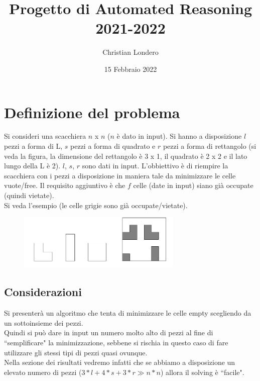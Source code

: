 \documentclass{article}
\title{Progetto di Automated Reasoning\\2021-2022}
\author{ Christian Londero }
\date{15 Febbraio 2022}
\begin{document}
\maketitle

\section{Definizione del problema}
Si consideri una scacchiera $n$ x $n$ ($n$ è dato in input). Si hanno a disposizione $l$ pezzi a forma di L, $s$ pezzi a forma di quadrato e $r$ pezzi a forma di rettangolo (si veda la figura, la dimensione del rettangolo è 3 x 1, il quadrato è 2 x 2 e il lato lungo della L è 2). $l$, $s$, $r$ sono dati in input. L'obbiettivo è di riempire la scacchiera con i pezzi a disposizione in maniera tale da minimizzare le celle vuote/free. Il requisito aggiuntivo è che $f$ celle (date in input) siano già occupate (quindi vietate).\\
Si veda l'esempio (le celle grigie sono già occupate/vietate).

\begin{figure}[ht!]
    \centering
    \includegraphics[width=0.7\textwidth]{images/def1.png}
\end{figure}

\subsection{Considerazioni}
Si presenterà un algoritmo che tenta di minimizzare le celle empty scegliendo da un sottoinsieme dei pezzi. \\
Quindi si può dare in input un numero molto alto di pezzi al fine di ``semplificare" la minimizzazione, sebbene si rischia in questo caso di fare utilizzare gli stessi tipi di pezzi quasi ovunque.\\
Nella sezione dei risultati vedremo infatti che se abbiamo a disposizione un elevato numero di pezzi ($3*l + 4*s + 3*r \gg n*n$) allora il solving è ``facile".
\end{document}
